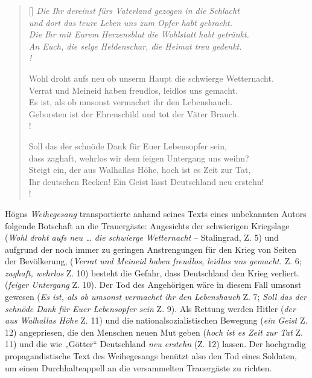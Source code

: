 \documentclass{book}
\begin{document}
\settowidth{\versewidth}{Wohl droht aufs neu ob unserm Haupt die schwierge Wetternacht.}
\begin{verse}[\versewidth]
\itshape
Die Ihr dereinst fürs Vaterland gezogen in die Schlacht \\
und dort das teure Leben uns zum Opfer habt gebracht. \\
Die Ihr mit Eurem Herzensblut die Wohlstatt habt getränkt. \\
An Euch, die selge Heldenschar, die Heimat treu gedenkt. \\!

Wohl droht aufs neu ob unserm Haupt die schwierge Wetternacht. \\
Verrat und Meineid haben freudlos, leidlos uns gemacht. \\
Es ist, als ob umsonst vermachet ihr den Lebenshauch. \\
Geborsten ist der Ehrenschild und tot der Väter Brauch. \\!

Soll das der schnöde Dank für Euer Lebensopfer sein, \\
dass zaghaft, wehrlos wir dem feigen Untergang uns weihn? \\
Steigt ein, der aus Walhallas Höhe, hoch ist es Zeit zur Tat, \\
Ihr deutschen Recken! Ein Geist lässt Deutschland neu erstehn! \\!
\end{verse}

Högns \textit{Weihegesang} transportierte anhand seines Texts eines
unbekannten Autors folgende Botschaft an die Trauergäste: Angesichts
der schwierigen Kriegslage (\textit{Wohl droht aufs neu … die schwierge
Wetternacht} – Stalingrad, Z. 5) und aufgrund der noch immer zu
geringen Anstrengungen für den Krieg von Seiten der Bevölkerung,
(\textit{Verrat und Meineid haben freudlos, leidlos uns gemacht.} Z. 6;
\textit{zaghaft, wehrlos} Z. 10) besteht die Gefahr, dass Deutschland
den Krieg verliert. (\textit{feiger Untergang} Z. 10). Der Tod des
Angehörigen wäre in diesem Fall umsonst gewesen (\textit{Es ist, als
ob umsonst vermachet ihr den Lebenshauch} Z. 7; \textit{Soll das der
schnöde Dank für Euer Lebensopfer sein} Z. 9). Als Rettung werden
Hitler (\textit{der aus Walhallas Höhe} Z. 11) und die
nationalsozialistischen Bewegung (\textit{ein Geist} Z. 12)
angepriesen, die den Menschen neuen Mut geben (\textit{hoch ist es Zeit
zur Tat} Z. 11) und die wie „Götter“ Deutschland \textit{neu erstehn}
(Z. 12) lassen. Der hochgradig propagandistische Text des
Weihegesangs benützt also den Tod eines Soldaten, um einen
Durchhalteappell an die versammelten Trauergäste zu richten.
\end{document}
